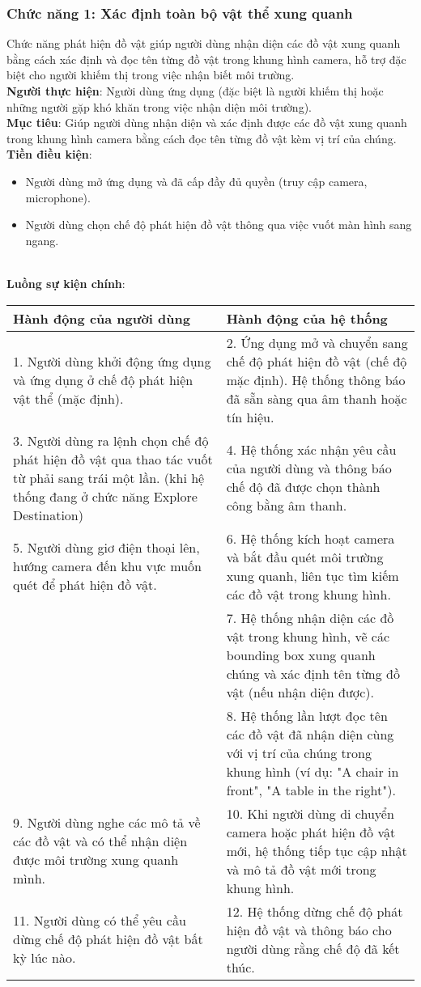 \documentclass[a4paper,12pt]{article}
\begin{document}
\subsubsection{Chức năng 1: Xác định toàn bộ vật thể xung quanh}
Chức năng phát hiện đồ vật giúp người dùng nhận diện các đồ vật xung quanh bằng cách xác định và đọc tên từng đồ vật trong khung hình camera, hỗ trợ đặc biệt cho người khiếm thị trong việc nhận biết môi trường.
\\
\textbf{Người thực hiện}: Người dùng ứng dụng (đặc biệt là người khiếm thị hoặc những người gặp khó khăn trong việc nhận diện môi trường).
\\
\textbf{Mục tiêu}: Giúp người dùng nhận diện và xác định được các đồ vật xung quanh trong khung hình camera bằng cách đọc tên từng đồ vật kèm vị trí của chúng.
\\
\textbf{Tiền điều kiện}:
\begin{itemize}
    \item Người dùng mở ứng dụng và đã cấp đầy đủ quyền (truy cập camera, microphone).
    \item Người dùng chọn chế độ phát hiện đồ vật thông qua việc vuốt màn hình sang ngang.
\end{itemize}
\\
\textbf{Luồng sự kiện chính}:
\\
\begin{longtable}{|p{6cm}|p{8cm}|}
\hline
\textbf{Hành động của người dùng} & \textbf{Hành động của hệ thống} \\
\hline
1. Người dùng khởi động ứng dụng và ứng dụng ở chế độ phát hiện vật thể (mặc định). & 
2. Ứng dụng mở và chuyển sang chế độ phát hiện đồ vật (chế độ mặc định). Hệ thống thông báo đã sẵn sàng qua âm thanh hoặc tín hiệu. \\
\hline
3. Người dùng ra lệnh chọn chế độ phát hiện đồ vật qua thao tác vuốt từ phải sang trái một lần. (khi hệ thống đang ở chức năng Explore Destination)  & 
4. Hệ thống xác nhận yêu cầu của người dùng và thông báo chế độ đã được chọn thành công bằng âm thanh. \\
\hline
5. Người dùng giơ điện thoại lên, hướng camera đến khu vực muốn quét để phát hiện đồ vật. & 
6. Hệ thống kích hoạt camera và bắt đầu quét môi trường xung quanh, liên tục tìm kiếm các đồ vật trong khung hình. \\
\hline
& 7. Hệ thống nhận diện các đồ vật trong khung hình, vẽ các bounding box xung quanh chúng và xác định tên từng đồ vật (nếu nhận diện được). \\
\hline
& 8. Hệ thống lần lượt đọc tên các đồ vật đã nhận diện cùng với vị trí của chúng trong khung hình (ví dụ: "A chair in front", "A table in the right"). \\
\hline
9. Người dùng nghe các mô tả về các đồ vật và có thể nhận diện được môi trường xung quanh mình. & 
10. Khi người dùng di chuyển camera hoặc phát hiện đồ vật mới, hệ thống tiếp tục cập nhật và mô tả đồ vật mới trong khung hình. \\
\hline
11. Người dùng có thể yêu cầu dừng chế độ phát hiện đồ vật bất kỳ lúc nào. & 
12. Hệ thống dừng chế độ phát hiện đồ vật và thông báo cho người dùng rằng chế độ đã kết thúc. \\
\hline
\end{longtable}
\end{document}
